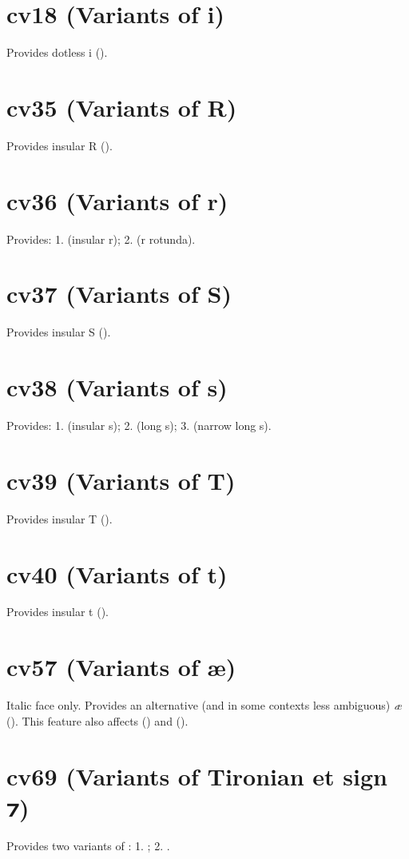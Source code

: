 \documentclass[12pt,letterpaper,openany]{book}
\begin{document}
\section{cv18 (Variants of i)}
Provides dotless i ().

\section{cv35 (Variants of R)}
Provides insular R ().

\section{cv36 (Variants of r)}
Provides: 1.  (insular r); 2.  (r rotunda).

\section{cv37 (Variants of S)}
Provides insular S ().

\section{cv38 (Variants of s)}
Provides: 1.  (insular s); 2.  (long s);
3.  (narrow long s).

\section{cv39 (Variants of T)}
Provides insular T ().

\section{cv40 (Variants of t)}
Provides insular t ().

\section{cv57 (Variants of æ)}
Italic face only. Provides an alternative (and in some contexts less ambiguous)
\textit{æ} (\textit{}).
This feature also affects  (\textit{})
and  (\textit{}).

\section{cv69 (Variants of Tironian et sign ⁊)}
Provides two variants of : 1. ; 2. .
\end{document}
